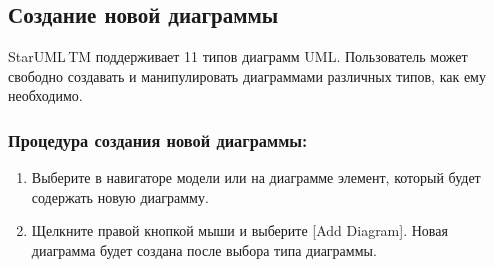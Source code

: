 \documentclass[a4paper,12pt]{report}
\newcommand{\staruml}{StarUML\,\tm}
\begin{document}
\subsection*{Создание новой диаграммы}
\staruml TM поддерживает 11 типов диаграмм UML. Пользователь может свободно создавать и
манипулировать диаграммами различных типов, как ему необходимо.
\subsubsection*{Процедура создания новой диаграммы:}
\begin{enumerate}
	\item Выберите в навигаторе модели или на диаграмме элемент, который будет содержать новую
	диаграмму.
	\item Щелкните правой кнопкой мыши и выберите [Add Diagram]. Новая диаграмма будет
	создана после выбора типа диаграммы.
\end{enumerate}
\end{document}
